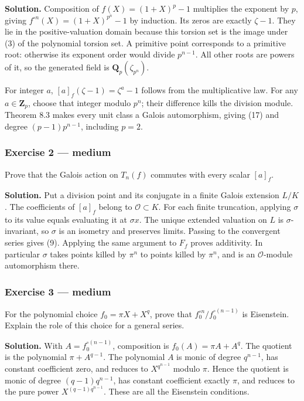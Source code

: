 \documentclass[11pt,a4paper]{article}
\begin{document}
\textbf{Solution.} Composition of \(f(X)=(1+X)^p-1\) multiplies the
exponent by \(p\), giving \(f^{\circ n}(X)=(1+X)^{p^n}-1\) by induction.
Its zeros are exactly \(\zeta-1\). They lie in the positive-valuation
domain because this torsion set is the image under (3) of the polynomial
torsion set. A primitive point corresponds to a primitive root:
otherwise its exponent order would divide \(p^{n-1}\). All other roots
are powers of it, so the generated field is
\(\mathbf Q_p(\zeta_{p^n})\).

For integer \(a\), \([a]_f(\zeta-1)=\zeta^a-1\) follows from the
multiplicative law. For any \(a\in\mathbf Z_p\), choose that integer
modulo \(p^n\); their difference kills the division module. Theorem 8.3
makes every unit class a Galois automorphism, giving (17) and degree
\((p-1)p^{n-1}\), including \(p=2\).

\subsubsection{Exercise 2 --- medium}\label{exercise-2-medium}

Prove that the Galois action on \(T_n(f)\) commutes with every scalar
\([a]_f\).

\textbf{Solution.} Put a division point and its conjugate in a finite
Galois extension \(L/K\). The coefficients of \([a]_f\) belong to
\(\mathcal O\subset K\). For each finite truncation, applying \(\sigma\)
to its value equals evaluating it at \(\sigma x\). The unique extended
valuation on \(L\) is \(\sigma\)-invariant, so \(\sigma\) is an isometry
and preserves limits. Passing to the convergent series gives (9).
Applying the same argument to \(F_f\) proves additivity. In particular
\(\sigma\) takes points killed by \(\pi^n\) to points killed by
\(\pi^n\), and is an \(\mathcal O\)-module automorphism there.

\subsubsection{Exercise 3 --- medium}\label{exercise-3-medium}

For the polynomial choice \(f_0=\pi X+X^q\), prove that
\(f_0^{\circ n}/f_0^{\circ(n-1)}\) is Eisenstein. Explain the role of
this choice for a general series.

\textbf{Solution.} With \(A=f_0^{\circ(n-1)}\), composition is
\(f_0(A)=\pi A+A^q\). The quotient is the polynomial \(\pi+A^{q-1}\).
The polynomial \(A\) is monic of degree \(q^{n-1}\), has constant
coefficient zero, and reduces to \(X^{q^{n-1}}\) modulo \(\pi\). Hence
the quotient is monic of degree \((q-1)q^{n-1}\), has constant
coefficient exactly \(\pi\), and reduces to the pure power
\(X^{(q-1)q^{n-1}}\). These are all the Eisenstein conditions.
\end{document}
